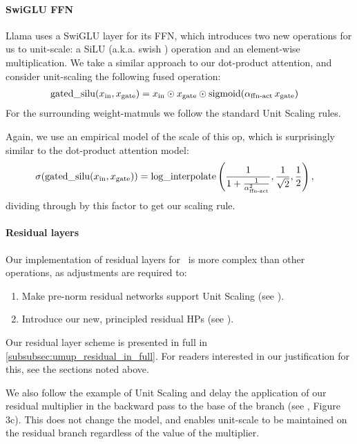 \paragraph{SwiGLU FFN}

Llama uses a SwiGLU \citep{GLU} layer for its FFN, which introduces two new operations for us to unit-scale: a SiLU \citep{SiLU} (a.k.a. swish \citep{Swish}) operation and an element-wise multiplication. We take a similar approach to our dot-product attention, and consider unit-scaling the following fused operation:
\begin{align*}
    \operatorname{gated\_silu}(x_\mathrm{in}, x_\mathrm{gate}) &= x_\mathrm{in} \odot x_\mathrm{gate} \odot \operatorname{sigmoid}(\alpha_{\mathrm{ffn{\text -}act}}\,x_\mathrm{gate})
\end{align*}
For the surrounding weight-matmuls we follow the standard Unit Scaling rules.

Again, we use an empirical model of the scale of this op, which is surprisingly similar to the dot-product attention model:
\begin{align*}
    \sigma(\operatorname{gated\_silu}(x_\mathrm{in}, x_\mathrm{gate})) &= \operatorname{log\_interpolate}\left(\frac{1}{1 + \frac{1}{\alpha_{\mathrm{ffn{\text -}act}}^2}}, \frac{1}{\sqrt{2}}, \frac{1}{2}\right),
\end{align*}
dividing through by this factor to get our scaling rule.

\paragraph{Residual layers}

Our implementation of residual layers for \umup\ is more complex than other operations, as adjustments are required to:
\begin{enumerate}
    \item Make pre-norm residual networks support Unit Scaling (see ).
    \item Introduce our new, principled residual HPs (see ).
\end{enumerate}
Our residual layer scheme is presented in full in \ref{subsubsec:umup_residual_in_full}. For readers interested in our justification for this, see the sections noted above.

We also follow the example of Unit Scaling and delay the application of our residual multiplier in the backward pass to the base of the branch (see \citep{Unit_Scaling}, Figure 3c). This does not change the model, and enables unit-scale to be maintained on the residual branch regardless of the value of the multiplier.

